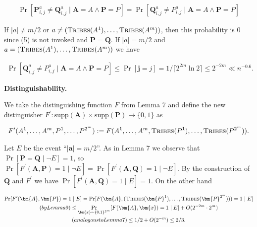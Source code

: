 \documentclass[10pt,a4paper]{article}
\begin{document}
\[\begin{gathered}
\displaystyle\Pr[\bm{P}^{a}_{i,j}\neq\bm{Q}^{a}_{i,j}\mid\bm{A}=A\land\bm{P}=P] \displaystyle=\Pr[\bm{Q}^{a}_{i,j}\neq P^{a}_{i,j}\mid\bm{A}=A\land\bm{P}=P]
\end{gathered}\]


If $|a|\neq m/2$ or $a\neq(\textsc{Tribes}(A^{1}),\dots,\textsc{Tribes}(A^{m}))$, then this probability is $0$ since (5) is not invoked and $\bm{P}=\bm{Q}$. If $|a|=m/2$ and $a=(\textsc{Tribes}(A^{1}),\dots,\textsc{Tribes}(A^{m}))$ we have\par


\[\begin{gathered}
\Pr[\bm{Q}^{a}_{i,j}\neq P^{a}_{i,j}\mid\bm{A}=A\land\bm{P}=P]\leq\Pr[\bm{j}=j]=1/\lceil 2^{2m}\ln 2\rceil\leq 2^{-2m}\ll n^{-0.6}.
\end{gathered}\]





\par\medskip\noindent\textbf{Distinguishability.}\par




We take the distinguishing function $F$ from Lemma 7 and define the new distinguisher $F^{\prime}\colon\mathrm{supp}(\bm{A})\times\mathrm{supp}(\bm{P})\to\{0,1\}$ as\par


\[\begin{gathered}
F^{\prime}(A^{1},\dots,A^{m},P^{1},\dots,P^{2^{m}}):=F(A^{1},\dots,A^{m},\textsc{Tribes}(P^{1}),\dots,\textsc{Tribes}(P^{2^{m}})).
\end{gathered}\]


Let $E$ be the event “$|\bm{a}|=m/2$”. As in Lemma 7 we observe that $\Pr[\bm{P}=\bm{Q}\mid\lnot E]=1$, so $\Pr[F^{\prime}(\bm{A},\bm{P})=1\mid\lnot E]=\Pr[F^{\prime}(\bm{A},\bm{Q})=1\mid\lnot E]$. By the construction of $\bm{Q}$ and $F^{\prime}$ we have $\Pr[F^{\prime}(\bm{A},\bm{Q})=1\mid E]=1$. On the other hand\par


\[\begin{gathered}
\displaystyle\Pr[F^{\prime}(\bm{A},\bm{P})=1\mid E] \displaystyle=\Pr[F(\bm{A},(\textsc{Tribes}(\bm{P}^{1}),\dots,\textsc{Tribes}(\bm{P}^{2^{m}})))=1\mid E] \\
(by Lemma 9) \displaystyle\leq\Pr_{\bm{x}\sim\{0,1\}^{2^{m}}}[F(\bm{A},\bm{x})=1\mid E]+O(2^{-2m}\cdot 2^{m}) \\
(analogous to Lemma 7) \displaystyle\leq 1/2+O(2^{-m})\leq 2/3.
\end{gathered}\]
\end{document}
